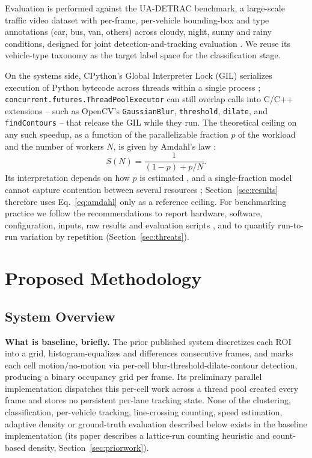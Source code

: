 \documentclass[conference]{IEEEtran}
\newcommand{\code}[1]{\texttt{#1}}
\begin{document}
Evaluation is performed against the UA-DETRAC benchmark, a large-scale
traffic video dataset with per-frame, per-vehicle bounding-box and
type annotations (car, bus, van, others) across cloudy, night, sunny and
rainy conditions, designed for joint detection-and-tracking evaluation
\cite{wen2020}. We reuse its vehicle-type taxonomy as the target label
space for the classification stage.

On the systems side, CPython's Global Interpreter Lock (GIL) serializes
execution of Python bytecode across threads within a single process
\cite{pythongil}; \code{concurrent.futures.ThreadPoolExecutor}
\cite{pythonfutures} can still overlap calls into C/C++ extensions --
such as OpenCV's \code{GaussianBlur}, \code{threshold}, \code{dilate}, and
\code{findContours} -- that release the GIL while they run. The
theoretical ceiling on any such speedup, as a function of the
parallelizable fraction $p$ of the workload and the number of workers
$N$, is given by Amdahl's law \cite{amdahl1967,alhayanni2020}:
\begin{equation}
S(N) = \frac{1}{(1-p) + p/N}.
\label{eq:amdahl}
\end{equation}
Its interpretation depends on how $p$ is estimated \cite{alhayanni2020},
and a single-fraction model cannot capture contention between several
resources \cite{poolla2023}; Section~\ref{sec:results} therefore uses
Eq.~\eqref{eq:amdahl} only as a reference ceiling. For benchmarking
practice we follow the recommendations to report hardware, software,
configuration, inputs, raw results and evaluation scripts
\cite{beyer2019}, and to quantify run-to-run variation by repetition
\cite{kalibera2013} (Section~\ref{sec:threats}).

\section{Proposed Methodology}
\label{sec:methodology}

\subsection{System Overview}
\label{sec:overview}

\textbf{What is baseline, briefly.} The prior published system
\cite{baseline} discretizes each ROI into a grid, histogram-equalizes
and differences consecutive frames, and marks each cell
motion/no-motion via per-cell blur-threshold-dilate-contour detection,
producing a binary occupancy grid per frame. Its preliminary parallel
implementation dispatches this per-cell work across a thread pool
created every frame and stores no persistent per-lane tracking state.
None of the clustering, classification, per-vehicle tracking,
line-crossing counting, speed estimation, adaptive density or
ground-truth evaluation described below exists in the baseline
implementation (its paper describes a lattice-run counting heuristic and
count-based density, Section~\ref{sec:priorwork}).
\end{document}
